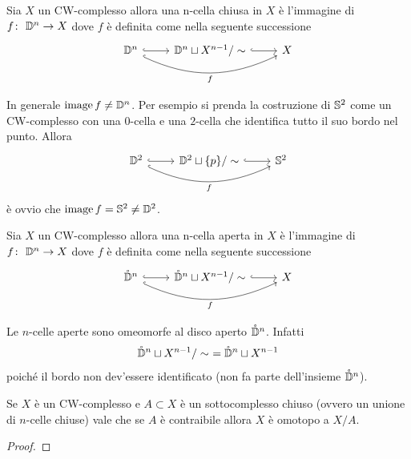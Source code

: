 \begin{definition}
	Sia $X$ un CW-complesso allora una n-cella chiusa in $X$ è l'immagine di $\morphism{f}{\D^n}{X}$ dove $f$ è definita come nella seguente successione
	\begin{equation*}
	\begin{tikzcd}
		\D^n \arrow[bend right=25, swap, hook]{rr}{f} \arrow[r,hook] & \D^n \sqcup X^{n-1} / \sim \arrow[r,hook] & X
	\end{tikzcd}
	\end{equation*}
\end{definition}

\begin{remark}
	In generale $\image{f} \neq \D^n$. Per esempio si prenda la costruzione di $\S^2$ come un CW-complesso con una $0$-cella e una $2$-cella che identifica tutto il suo bordo nel punto. Allora 
	\begin{equation*}
	\begin{tikzcd}
		\D^2 \arrow[bend right=25, swap, hook]{rr}{f} \arrow[r,hook] & \D^2 \sqcup \{p\} / \sim \arrow[r,hook] & \S^2
	\end{tikzcd}
	\end{equation*}
	è ovvio che $\image{f} = \S^2 \neq \D^2$. 
\end{remark}

\begin{definition}
	Sia $X$ un CW-complesso allora una n-cella aperta in $X$ è l'immagine di $\morphism{f}{\D^n}{X}$ dove $f$ è definita come nella seguente successione
	\begin{equation}
	\begin{tikzcd}
	\mathring{\D}^n \arrow[bend right=25, swap, hook]{rr}{f} \arrow[r,hook] & \mathring{\D}^n \sqcup X^{n-1} / \sim \arrow[r,hook] & X
	\end{tikzcd}
	\end{equation}
\end{definition}

\begin{remark}
	Le $n$-celle aperte sono omeomorfe al disco aperto $\mathring{\D}^n$. Infatti 
	\begin{equation*}
		\mathring{\D}^n \sqcup X^{n-1} / \sim\ = \mathring{\D}^n \sqcup X^{n-1}
	\end{equation*}
	poiché il bordo non dev'essere identificato (non fa parte dell'insieme $\mathring{\D}^n$).
\end{remark}

\begin{theorem}
	\label{thr:contrai_ncelle_cw_complesso}
	Se $X$ è un CW-complesso e $A \subset X$ è un sottocomplesso chiuso (ovvero un unione di $n$-celle chiuse) vale che se $A$ è contraibile allora $X$ è omotopo a $X / A$.
\end{theorem}
\begin{proof}
\end{proof}

